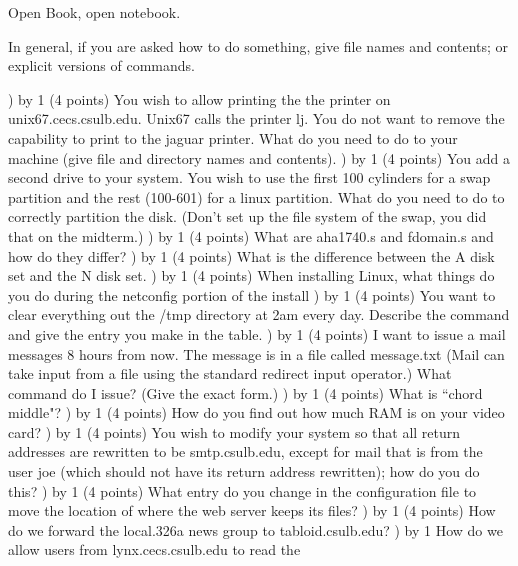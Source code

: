 
\parindent=0in
\nopagenumbers
\newcount\quesno
{}
\def\ques{\number\quesno) \advance\quesno by 1}
\def\aspace{\vskip 1.5in}

Open Book, open notebook.

In general, if you are asked how to do something,
give file names and contents; or explicit versions of commands.

\ques
(4 points)
You wish to allow printing the the printer on unix67.cecs.csulb.edu.
Unix67 calls the printer {\ltt{}lj}.
You do not want to remove the capability to print to the jaguar printer.
What do you need to do to your machine (give file and directory names and 
contents).
\vskip 2.5in
\ques
(4 points)
You add a second drive to your system.
You wish to use the first 100 cylinders for a swap partition and the
rest (100-601) for a linux partition.
What do you need to do to correctly partition the disk. 
(Don't set up the file system of the swap, you did that on the midterm.)
\vskip 2.5in
\ques
(4 points)
What are {\ltt{}aha1740.s} and {\ltt{}fdomain.s} and how do they differ?
\vskip 1.0in
\ques
(4 points)
What is the difference between the A disk set and the N disk set.
\vfill\eject
\ques
(4 points)
When installing Linux,
what things do you do during the netconfig portion of the install
\vskip 1.0in
\ques
(4 points)
You want to clear everything out the {\ltt{}/tmp} directory at 2am
every day.
Describe the command and give the entry you make in the table.
\vskip 1.0in
\ques
(4 points)
I want to issue a mail messages 8 hours from now. The message
is in a file called {\ltt{}message.txt}
(Mail can take input from a file using the standard redirect input operator.)
What command do I issue? (Give the exact form.)
\vskip 0.7in
\ques
(4 points)
What is ``chord middle"?
\vskip 0.7in
\ques
(4 points)
How do you find out how much RAM is on your video card?
\vskip 0.7in
\ques
(4 points)
You wish to modify your system so that all return addresses
are rewritten to be {\ltt{}smtp.csulb.edu},
except for mail that is from the user {\ltt{}joe} (which should not have 
its return address rewritten);
how do you do this?
\vskip 1.8in
\ques
(4 points)
What entry do you change in the configuration file to move the
location of where the web server keeps its files?
\vfill\eject
\ques
(4 points)
How do we forward the local.326a news group to {\ltt{}tabloid.csulb.edu}?
\vskip 1.5in
\ques
How do we allow users from {\ltt{}lynx.cecs.csulb.edu} to read the
